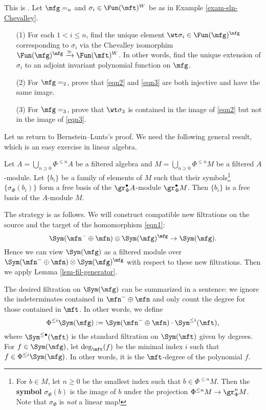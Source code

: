	\begin{exe}
		This is . Let $\mfg=\sl_n$ and $\sigma_i \in \Fun(\mft)^W$ be as in Example \ref{exam-sln-Chevalley}.
		\begin{itemize}
			\item[(1)]
				For each $1<i\le n$, find the unique element $\wt\sigma_i \in \Fun(\mfg)^\mfg$ corresponding to $\sigma_i$ via the Chevalley isomorphim $\Fun(\mfg)^\mfg \xrightarrow{\simeq}  \Fun(\mft)^W$. In other words, find the unique extension of $\sigma_i$ to an adjoint invariant polynomial function on $\mfg$.
			\item[(2)]
				For $\mfg=\sl_2$, prove that \eqref{eqn2} and \eqref{eqn3} are both injective and have the same image.
			\item[(3)]
				For $\mfg=\sl_3$, prove that $\wt\sigma_3$ is contained in the image of \eqref{eqn2} but not in the image of \eqref{eqn3}.
		\end{itemize}
	\end{exe}


	Let us return to Bernstein--Lunts's proof. We need the following general result, which is an easy exercise in linear algebra.

	\begin{lem}
		\label{lem-fil-generator}
		Let $A = \bigcup_{n\ge 0} \Phi^{\le n} A$ be a filtered algebra and $M =\bigcup_{n\ge 0} \Phi^{\le n} M$ be a filtered $A$-module. Let $\{b_i\}$ be a family of elements of $M$ such that their symbols\footnote{For $b\in M$, let $n\ge 0$ be the smallest index such that $b\in \Phi^{\le n} M$. Then the \textbf{symbol} $\sigma_\Phi(b)$ is the image of $b$ under the projection $\Phi^{\le n} M \to \gr_\Phi^n M$. Note that $\sigma_\Phi$ is \emph{not} a linear map!} $\{ \sigma_\Phi(b_i) \}$ form a free basis of the $\gr_\Phi^\bullet A$-module $\gr_\Phi^\bullet M$. Then $\{b_i\}$ is a free basis of the $A$-module $M$.
	\end{lem}

		The strategy is as follows. We will construct compatible new filtrations on the source and the target of the homomorphism \eqref{eqn1}: 
		\[
			\Sym(\mfn^-\oplus \mfn) \ot \Sym(\mfg)^\mfg  \to \Sym(\mfg).
		\]
		Hence we can view $\Sym(\mfg)$ as a filtered module over $\Sym(\mfn^-\oplus \mfn) \ot \Sym(\mfg)^\mfg$ with respect to these new filtrations. Then we apply Lemma \ref{lem-fil-generator}.

		The desired filtration on $\Sym(\mfg)$ can be summarized in a sentence: we ignore the indeterminates contained in $\mfn^-\oplus \mfn$ and only count the degree for those contained in $\mft$. In other words, we define
		\[
			\Phi^{\le i} \Sym(\mfg) := \Sym(\mfn^-\oplus \mfn) \cdot \Sym^{\le i}(\mft),
		\]
		where $\Sym^{\le \bullet}(\mft)$ is the standard filtration on $\Sym(\mft)$ given by degrees. For $f\in \Sym(\mfg)$, let $\deg_\mft(f)$ be the minimal index $i$ such that $f\in \Phi^{\le i} \Sym(\mfg)$. In other words, it is the $\mft$-degree of the polynomial $f$.

